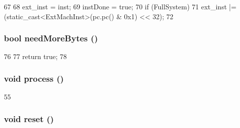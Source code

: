 \begin{DoxyCode}
67     {
68         ext_inst = inst;
69         instDone = true;
70         if (FullSystem)
71             ext_inst |= (static_cast<ExtMachInst>(pc.pc() & 0x1) << 32);
72     }
\end{DoxyCode}
\hypertarget{classAlphaISA_1_1Decoder_a35631c47fc45b69ca30e6551f9f5d1d1}{
\subsubsection[{needMoreBytes}]{\setlength{\rightskip}{0pt plus 5cm}bool needMoreBytes ()}}
\label{classAlphaISA_1_1Decoder_a35631c47fc45b69ca30e6551f9f5d1d1}



\begin{DoxyCode}
76     {
77         return true;
78     }
\end{DoxyCode}
\hypertarget{classAlphaISA_1_1Decoder_a2e9c5136d19b1a95fc427e0852deab5c}{
\subsubsection[{process}]{\setlength{\rightskip}{0pt plus 5cm}void process ()}}
\label{classAlphaISA_1_1Decoder_a2e9c5136d19b1a95fc427e0852deab5c}



\begin{DoxyCode}
55     { }
\end{DoxyCode}
\hypertarget{classAlphaISA_1_1Decoder_ad20897c5c8bd47f5d4005989bead0e55}{
\subsubsection[{reset}]{\setlength{\rightskip}{0pt plus 5cm}void reset ()}}
\label{classAlphaISA_1_1Decoder_ad20897c5c8bd47f5d4005989bead0e55}



